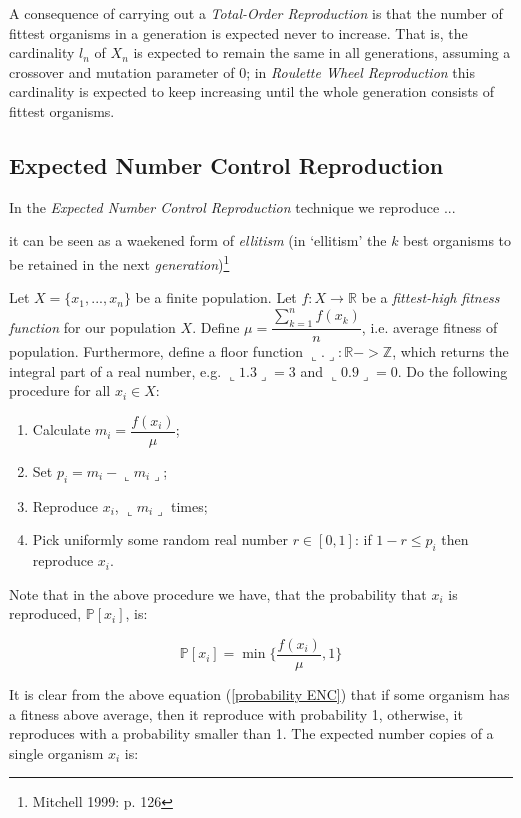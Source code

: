 \documentclass[a4paper]{article}
\newcommand{\fl}{\llcorner}
\newcommand{\fr}{\lrcorner}
\newcommand{\Prob}[1]{\mathbb{P}[#1]}
\theoremstyle{dotless}
\begin{document}
A consequence of carrying out a \emph{Total-Order Reproduction} is that the number of fittest organisms in a generation is expected never to increase. That is, the cardinality $l_n$ of $X_n$ is expected to remain the same in all generations, assuming a crossover and mutation parameter of 0; in \emph{Roulette Wheel Reproduction} this cardinality is expected to keep increasing until the whole generation consists of fittest organisms.

\subsection{Expected Number Control Reproduction}

In the \emph{Expected Number Control Reproduction} technique we reproduce ...

it can be seen as a waekened form of \emph{ellitism} (in `ellitism' the $k$ best organisms to be retained in the next \emph{generation})\footnote{Mitchell 1999: p. 126}


Let $X = \{x_1,...,x_n \}$ be a finite population. Let $f: X \rightarrow \mathbb{R}$ be a \emph{fittest-high fitness function} for our population $X$. Define $\mu = \dfrac{\sum^n_{k=1} f(x_k)}{n}$, i.e. average fitness of population. Furthermore, define a floor function $\llcorner . \lrcorner: \mathbb{R} -> \mathbb{Z}$, which returns the integral part of a real number, e.g. $\fl 1.3 \fr = 3$ and $\fl 0.9 \fr = 0$. Do the following procedure for all $x_i \in X$:

	\begin{enumerate}
	\item Calculate $m_i = \dfrac{f(x_i)}{\mu}$;
	\item Set $p_i = m_i - \fl m_i \fr$;
	\item Reproduce $x_i$, $\fl m_i \fr$ times;
	\item Pick uniformly some random real number $r \in [0,1]$: if $1 - r \leq p_i$ then reproduce $x_i$.
	\end{enumerate}
	
Note that in the above procedure we have, that the probability that $x_i$ is reproduced, $\Prob{x_i}$, is:

\begin{equation}\label{probability ENC}
\Prob{x_i} = \min \{ \dfrac{f(x_i)}{\mu}, 1 \}
\end{equation}

It is clear from the above equation (\ref{probability ENC}) that if some organism has a fitness above average, then it reproduce with probability 1, otherwise, it reproduces with a probability smaller than 1. The expected number copies of a single organism $x_i$ is:
\end{document}
